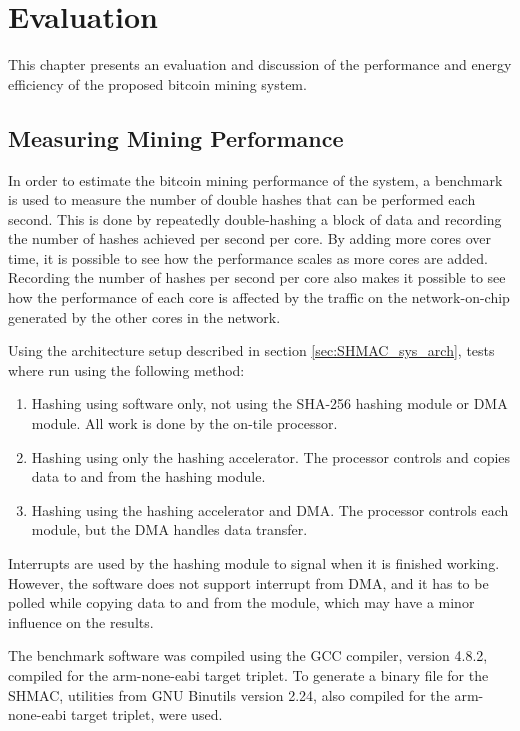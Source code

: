 \chapter{Evaluation}

This chapter presents an evaluation and discussion of the performance and energy efficiency
of the proposed bitcoin mining system.

\section{Measuring Mining Performance}

In order to estimate the bitcoin mining performance of the system, a benchmark is used to
measure the number of double hashes that can be performed each second.
This is done by repeatedly double-hashing a block of data and recording the
number of hashes achieved per second per core. By adding more cores over time, it
is possible to see how the performance scales as more cores are added. Recording
the number of hashes per second per core also makes it possible to see how the performance
of each core is affected by the traffic on the network-on-chip generated by the other
cores in the network.

Using the architecture setup described in section \ref{sec:SHMAC_sys_arch}, tests where run using the
following method:

\begin{enumerate}
    \item Hashing using software only, not using the SHA-256 hashing module or DMA module.
    All work is done by the on-tile processor.
    \item Hashing using only the hashing accelerator.
    The processor controls and copies data to and from the hashing module.
    \item Hashing using the hashing accelerator and DMA.
    The processor controls each module, but the DMA handles data transfer.
\end{enumerate}

Interrupts are used by the hashing module to signal when it is finished working. However,
the software does not support interrupt from DMA, and it has to be polled while copying data to and from
the module, which may have a minor influence on the results.

The benchmark software was compiled using the GCC compiler, version 4.8.2, compiled for
the arm-none-eabi target triplet. To generate a binary file for the SHMAC, utilities
from GNU Binutils version 2.24, also compiled for the arm-none-eabi target triplet,
were used.

